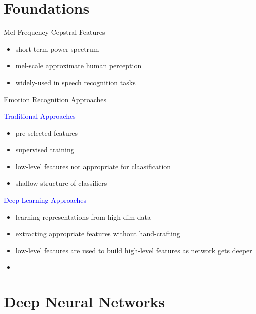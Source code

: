 \section{Foundations} %
\begin{frame}[t]{Mel Frequency Cepstral Features}
\begin{itemize}
 \item short-term power spectrum 
 \item mel-scale approximate human perception
 \item widely-used in speech recognition tasks
\end{itemize}

	

\end{frame}

\begin{frame}[t]{Emotion Recognition Approaches}
	\begin{minipage}[t]{0.48\linewidth}
	  \textcolor{blue}{\Large Traditional Approaches}
	  \begin{itemize}
	   \item pre-selected features
	   \item supervised training
	   \item low-level features not appropriate for claasification
	   \item shallow structure of classifiers
	  \end{itemize}
	\end{minipage}
	\begin{minipage}[t]{0.48\linewidth}
	\textcolor{blue}{\Large Deep Learning Approaches}
	  \begin{itemize}
	   \item learning representations from high-dim data
	   \item extracting appropriate features without hand-crafting
	   \item low-level features are used to build high-level features as network gets deeper
	   \item 
	  \end{itemize}

	\end{minipage}

\end{frame}


\section{Deep Neural Networks}%
